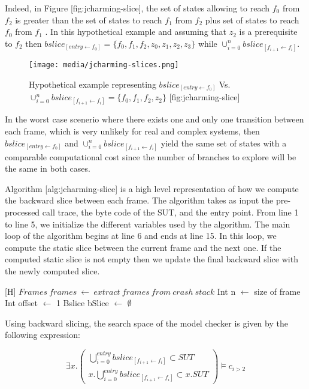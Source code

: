 Indeed, in Figure {[}fig:jcharming-slice{]}, the set of states allowing
to reach \(f_0\) from \(f_2\) is greater than the set of states to reach
\(f_1\) from \(f_2\) plus set of states to reach \(f_0\) from \(f_1\) .
In this hypothetical example and assuming that \(z_2\) is a prerequisite
to \(f_2\) then
\(bslice_{[entry \leftarrow f_0]} = \{f_0 , f_1 , f_2 , z_0 , z_1 , z_2 , z_3 \}\)
while \(\cup_{i=0}^n bslice_{[f_{i+1} \leftarrow f_i]}\).

\begin{figure}[htbp]
\centering
\texttt{[image: media/jcharming-slices.png]}
\caption{Hypothetical example representing
\(bslice_{[entry \leftarrow f_0]}\) Vs.
\(\cup_{i=0}^n bslice_{[f_{i+1} \leftarrow f_i]} = \{f_0 , f_1 , f_2 , z_2 \}\)
{[}fig:jcharming-slice{]}}
\end{figure}

In the worst case scenerio where there exists one and only one
transition between each frame, which is very unlikely for real and
complex systems, then \(bslice_{[entry \leftarrow f_0]}\) and
\(\cup_{i=0}^n bslice_{[f_{i+1} \leftarrow f_i]}\) yield the same set of
states with a comparable computational cost since the number of branches
to explore will be the same in both cases.

Algorithm {[}alg:jcharming-slice{]} is a high level representation of
how we compute the backward slice between each frame. The algorithm
takes as input the pre-processed call trace, the byte code of the SUT,
and the entry point. From line 1 to line 5, we initialize the different
variables used by the algorithm. The main loop of the algorithm begins
at line 6 and ends at line 15. In this loop, we compute the static slice
between the current frame and the next one. If the computed static slice
is not empty then we update the final backward slice with the newly
computed slice.

{[}H{]} \(Frames~frames~\leftarrow~extract~frames~from~crash~stack\) Int
n \(\leftarrow\) size of frame Int offset \(\leftarrow\) 1 Bslice bSlice
\(\leftarrow\) \(\emptyset\)

Using backward slicing, the search space of the model checker is given
by the following expression:

\[\exists x.
  \begin{pmatrix}
    \bigcup_{i=0}^{entry} bslice_{[f_{i+1} \leftarrow f_i]}  \subset SUT \\
    x.\bigcup_{i=0}^{entry} bslice_{[f_{i+1} \leftarrow f_i]}  \subset x.SUT
  \end{pmatrix}
  \models c_{i>2}\]

